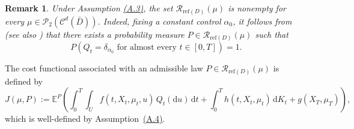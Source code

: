 \documentclass[11pt,amsfonts]{article}
\theoremstyle{plain}
\newtheorem{remark}{Remark}
\theoremstyle{assumpstyle}
\numberwithin{equation}{section}
\numberwithin{theorem}{section}
\numberwithin{proposition}{section}
\numberwithin{definition}{section}
\numberwithin{remark}{section}
\numberwithin{corollary}{section}
\numberwithin{lemma}{section}
\begin{document}
\begin{remark}
Under Assumption \hyperlink{A.3}{(A.3)}, the set $\mathcal{R}_{\mathrm{ref}(D)}(\mu)$ is nonempty for every $\mu \in \mathcal{P}_2(\mathcal{C}^d(\bar{D}))$. 
Indeed, fixing a constant control $\alpha_0$, it follows from \cite[Theorem~1.1]{Sznitman} (see also \cite[Theorem~4.1]{Tanaka-existence}) that there exists a probability measure 
$P \in \mathcal{R}_{\mathrm{ref}(D)}(\mu)$ such that
\begin{equation*}
P\left( Q_t = \delta_{\alpha_0} \text{ for almost every } t \in [0,T] \right) = 1.
\end{equation*}
\end{remark}
The cost functional associated with an admissible law $P \in \mathcal{R}_{\mathrm{ref}(D)}(\mu)$ is defined by
\begin{equation} \label{eq:cost-functional}
J(\mu, P)
:= \mathbb{E}^{P}\left(
\int_0^T \int_U f(t, X_t, \mu_t, u) \, Q_t(\mathrm{d}u)\, \mathrm{d}t
+ \int_0^T h(t, X_t, \mu_t) \, \mathrm{d}K_t
+ g(X_T, \mu_T)
\right),
\end{equation}
which is well-defined by Assumption~\hyperlink{A.4}{(A.4)}.
\end{document}
